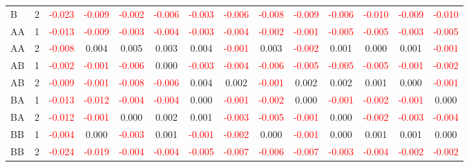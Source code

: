 \begin{table}[H]
{\begin{tabular}{llcccccccccccc}
B & 2 & \textcolor{red}{-0.023} & \textcolor{red}{-0.009} & \textcolor{red}{-0.002} & \textcolor{red}{-0.006} & \textcolor{red}{-0.003} & \textcolor{red}{-0.006} & \textcolor{red}{-0.008} & \textcolor{red}{-0.009} & \textcolor{red}{-0.006} & \textcolor{red}{-0.010} & \textcolor{red}{-0.009} & \textcolor{red}{-0.010}\\
AA & 1 & \textcolor{red}{-0.013} & \textcolor{red}{-0.009} & \textcolor{red}{-0.003} & \textcolor{red}{-0.004} & \textcolor{red}{-0.003} & \textcolor{red}{-0.004} & \textcolor{red}{-0.002} & \textcolor{red}{-0.001} & \textcolor{red}{-0.005} & \textcolor{red}{-0.005} & \textcolor{red}{-0.003} & \textcolor{red}{-0.005}\\
AA & 2 & \textcolor{red}{-0.008} & 0.004 & 0.005 & 0.003 & 0.004 & \textcolor{red}{-0.001} & 0.003 & \textcolor{red}{-0.002} & 0.001 & 0.000 & 0.001 & \textcolor{red}{-0.001}\\
AB & 1 & \textcolor{red}{-0.002} & \textcolor{red}{-0.001} & \textcolor{red}{-0.006} & 0.000 & \textcolor{red}{-0.003} & \textcolor{red}{-0.004} & \textcolor{red}{-0.006} & \textcolor{red}{-0.005} & \textcolor{red}{-0.005} & \textcolor{red}{-0.005} & \textcolor{red}{-0.001} & \textcolor{red}{-0.002}\\
AB & 2 & \textcolor{red}{-0.009} & \textcolor{red}{-0.001} & \textcolor{red}{-0.008} & \textcolor{red}{-0.006} & 0.004 & 0.002 & \textcolor{red}{-0.001} & 0.002 & 0.002 & 0.001 & 0.000 & \textcolor{red}{-0.001}\\
BA & 1 & \textcolor{red}{-0.013} & \textcolor{red}{-0.012} & \textcolor{red}{-0.004} & \textcolor{red}{-0.004} & 0.000 & \textcolor{red}{-0.001} & \textcolor{red}{-0.002} & 0.000 & \textcolor{red}{-0.001} & \textcolor{red}{-0.002} & \textcolor{red}{-0.001} & 0.000\\
BA & 2 & \textcolor{red}{-0.012} & \textcolor{red}{-0.001} & 0.000 & 0.002 & 0.001 & \textcolor{red}{-0.003} & \textcolor{red}{-0.005} & \textcolor{red}{-0.001} & 0.000 & \textcolor{red}{-0.002} & \textcolor{red}{-0.003} & \textcolor{red}{-0.004}\\
BB & 1 & \textcolor{red}{-0.004} & 0.000 & \textcolor{red}{-0.003} & 0.001 & \textcolor{red}{-0.001} & \textcolor{red}{-0.002} & 0.000 & \textcolor{red}{-0.001} & 0.000 & 0.001 & 0.001 & 0.000\\
BB & 2 & \textcolor{red}{-0.024} & \textcolor{red}{-0.019} & \textcolor{red}{-0.004} & \textcolor{red}{-0.004} & \textcolor{red}{-0.005} & \textcolor{red}{-0.007} & \textcolor{red}{-0.006} & \textcolor{red}{-0.007} & \textcolor{red}{-0.003} & \textcolor{red}{-0.004} & \textcolor{red}{-0.002} & \textcolor{red}{-0.002}\\

\end{tabular}}
\end{table}
